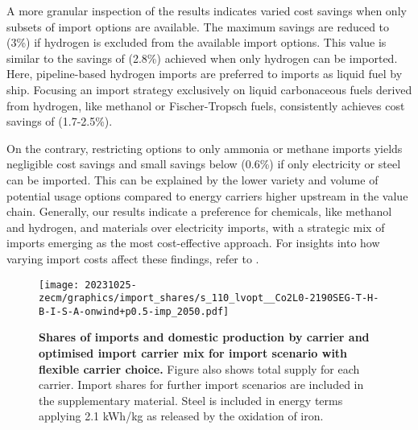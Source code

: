 
A more granular inspection of the results indicates varied cost savings when
only subsets of import options are available. The maximum savings are reduced to
 (3\%) if hydrogen is excluded from the available import options.
This value is similar to the savings of  (2.8\%) achieved when only
hydrogen can be imported. Here, pipeline-based hydrogen imports are preferred to
imports as liquid fuel by ship.
Focusing an import strategy exclusively on
liquid carbonaceous fuels derived from hydrogen, like methanol or
Fischer-Tropsch fuels, consistently achieves cost savings of 
(1.7-2.5\%).

On the contrary, restricting options to only ammonia or methane imports yields
negligible cost savings and small savings below  (0.6\%) if only
electricity or steel can be imported. This can be explained by the lower variety
and volume of potential usage options compared to energy carriers higher
upstream in the value chain. Generally, our results indicate a preference for
chemicals, like methanol and hydrogen, and materials over electricity imports,
with a strategic mix of imports emerging as the most cost-effective approach.
For insights into how varying import costs affect these findings, refer to
. 

\begin{figure}[!htb]
    \texttt{[image: 20231025-zecm/graphics/import\_shares/s\_110\_lvopt\_\_Co2L0-2190SEG-T-H-B-I-S-A-onwind+p0.5-imp\_2050.pdf]}
    \caption{\textbf{Shares of imports and domestic production by carrier and optimised import carrier mix for import scenario with flexible carrier choice.} 
        Figure also shows total supply for each carrier.
        Import shares for further import scenarios are included in the supplementary material.
        Steel is included in energy terms applying 2.1 kWh/kg as released by the oxidation of iron.
    }
    \label{fig:import-shares}
\end{figure}



